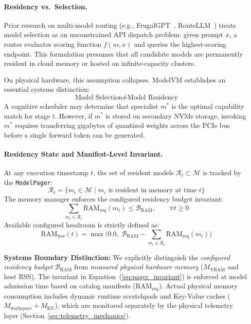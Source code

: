 \paragraph{Residency vs.\ Selection.}
Prior research on multi-model routing (e.g., FrugalGPT~\cite{chen2023frugalgpt}, RouteLLM~\cite{ong2024routellm}) treats model selection as an unconstrained API dispatch problem: given prompt $x$, a router evaluates scoring function $f(m, x)$ and queries the highest-scoring endpoint. This formulation presumes that all candidate models are permanently resident in cloud memory or hosted on infinite-capacity clusters. 

On physical hardware, this assumption collapses. ModelVM establishes an essential systems distinction:
\begin{equation}
\text{Model Selection} \neq \text{Model Residency}
\end{equation}
A cognitive scheduler may determine that specialist $m^*$ is the optimal capability match for stage $t$. However, if $m^*$ is stored on secondary NVMe storage, invoking $m^*$ requires transferring gigabytes of quantized weights across the PCIe bus before a single forward token can be generated.

\paragraph{Residency State and Manifest-Level Invariant.}
At any execution timestamp $t$, the set of resident models $\mathcal{R}_t \subset \mathcal{M}$ is tracked by the \texttt{ModelPager}:
\begin{equation}
\mathcal{R}_t = \{m_i \in \mathcal{M} \mid m_i \text{ is resident in memory at time } t\}
\end{equation}
The memory manager enforces the configured residency budget invariant:
\begin{equation}
\sum_{m_i \in \mathcal{R}_t} \text{RAM}_{\text{req}}(m_i) \le \mathcal{B}_{\text{RAM}}, \qquad \forall t \ge 0
\label{eq:pager_invariant}
\end{equation}
Available configured headroom is strictly defined as:
\begin{equation}
\text{RAM}_{\text{free}}(t) = \max\Big(0.0, \;\mathcal{B}_{\text{RAM}} - \sum_{m_i \in \mathcal{R}_t} \text{RAM}_{\text{req}}(m_i)\Big)
\end{equation}

\noindent\textbf{Systems Boundary Distinction:}
We explicitly distinguish the \textit{configured residency budget} $\mathcal{B}_{\text{RAM}}$ from \textit{measured physical hardware memory} ($M_{\text{VRAM}}$ and host RSS). The invariant in Equation~(\ref{eq:pager_invariant}) is enforced at model admission time based on catalog manifests ($\text{RAM}_{\text{req}}$). Actual physical memory consumption includes dynamic runtime scratchpads and Key-Value caches ($M_{\text{workspace}} + M_{\text{KV}}$), which are monitored separately by the physical telemetry layer (Section~\ref{sec:telemetry_mechanics}).

